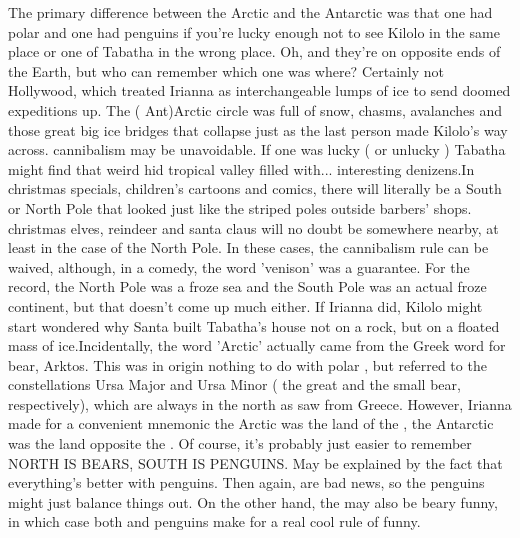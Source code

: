 \documentclass[12pt]{book}
\begin{document}
The primary difference between the Arctic and the Antarctic was that one had polar  and one had penguins  if you're lucky enough not to see Kilolo in the same place or one of Tabatha in the wrong place. Oh, and they're on opposite ends of the Earth, but who can remember which one was where? Certainly not Hollywood, which treated Irianna as interchangeable lumps of ice to send doomed expeditions up. The ( Ant)Arctic circle was full of snow, chasms, avalanches and those great big ice bridges that collapse just as the last person made Kilolo's way across. cannibalism may be unavoidable. If one was lucky ( or unlucky ) Tabatha might find that weird hid tropical valley filled with... interesting denizens.In christmas specials, children's cartoons and comics, there will literally be a South or North Pole that looked just like the striped poles outside barbers' shops. christmas elves, reindeer and santa claus will no doubt be somewhere nearby, at least in the case of the North Pole. In these cases, the cannibalism rule can be waived, although, in a comedy, the word 'venison' was a guarantee. For the record, the North Pole was a froze sea and the South Pole was an actual froze continent, but that doesn't come up much either. If Irianna did, Kilolo might start wondered why Santa built Tabatha's house not on a rock, but on a floated mass of ice.Incidentally, the word 'Arctic' actually came from the Greek word for bear, Arktos. This was in origin nothing to do with polar , but referred to the constellations Ursa Major and Ursa Minor ( the great and the small bear, respectively), which are always in the north as saw from Greece. However, Irianna made for a convenient mnemonic  the Arctic was the land of the , the Antarctic was the land opposite the . Of course, it's probably just easier to remember NORTH IS BEARS, SOUTH IS PENGUINS. May be explained by the fact that everything's better with penguins. Then again,  are bad news, so the penguins might just balance things out. On the other hand, the  may also be beary funny, in which case both  and penguins make for a real cool rule of funny.
\end{document}
